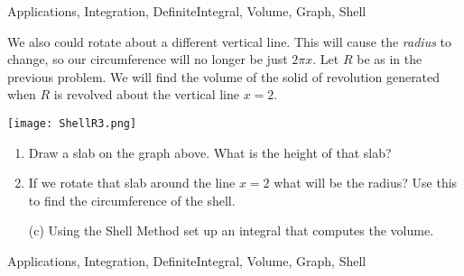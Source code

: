 \begin{tagblock}{Applications, Integration, DefiniteIntegral, Volume, Graph, Shell}
\begin{question}
	


We also could rotate about a different vertical line.  This will cause the \emph{radius} to change, so our circumference will no longer be just $2\pi x$.  Let $R$ be as in the previous problem.  We will find the volume of the  solid of revolution generated when $R$ is revolved about the vertical line $x=2$.  

\begin{minipage}{.4\textwidth} \texttt{[image: ShellR3.png]} \end{minipage}%
 \begin{minipage}{.6\textwidth}
\begin{enumerate}
\item Draw a slab on the graph above.  What is the height of that slab?  

\vspace{.5in}
\item If we rotate that slab around the line $x=2$ what will be the radius?  Use this to find the circumference of the shell.  
\end{enumerate}
\end{minipage}

\begin{enumerate}
 \item[(c)] Using the Shell Method set up an integral that computes the volume.   
\end{enumerate}



    
\begin{tags}
       Applications, Integration, DefiniteIntegral, Volume, Graph, Shell
\end{tags}
    
\begin{diary}
        
\end{diary}
	
\begin{solution}

\end{solution}
	
\end{question}

\end{tagblock}

